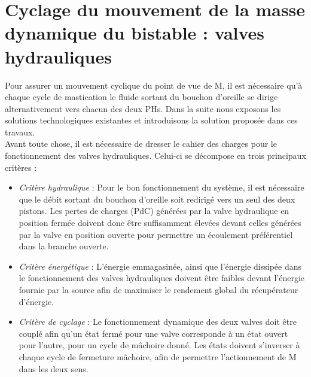 \section{Cyclage du mouvement de la masse dynamique du bistable : valves hydrauliques}
\label{sec:2.2_Cyclage du mouvement de la masse dynamique du bistable : valves hydrauliques}
	Pour assurer un mouvement cyclique du point de vue de M, il est nécessaire qu'à chaque cycle de mastication le fluide sortant du bouchon d'oreille se dirige alternativement vers chacun des deux PHs. Dans la suite nous exposons les solutions technologiques existantes et introduisons la solution proposée dans ces travaux.\\ 
	Avant toute chose, il est nécessaire de dresser le cahier des charges pour le fonctionnement des valves hydrauliques. Celui-ci se décompose en trois principaux critères :
\begin{itemize}
	\item \emph{Critère hydraulique} : Pour le bon fonctionnement du système, il est nécessaire que le débit sortant du bouchon d'oreille soit redirigé vers un seul des deux pistons. Les pertes de charges (PdC) générées par la valve hydraulique en position fermée doivent donc être suffisamment élevées devant celles générées par la valve en position ouverte pour permettre un écoulement préférentiel dans la branche ouverte.
	\item \emph{Critère énergétique} : L'énergie emmagasinée, ainsi que l'énergie dissipée dans le fonctionnement des valves hydrauliques doivent être faibles devant l'énergie fournie par la source afin de maximiser le rendement global du récupérateur d'énergie.
	\item \emph{Critère de cyclage} : Le fonctionnement dynamique des deux valves doit être couplé afin qu'un état fermé pour une valve corresponde à un état ouvert pour l'autre, pour un cycle de mâchoire donné. Les états doivent s'inverser à chaque cycle de fermeture mâchoire, afin de permettre l'actionnement de M dans les deux sens.
\end{itemize}

